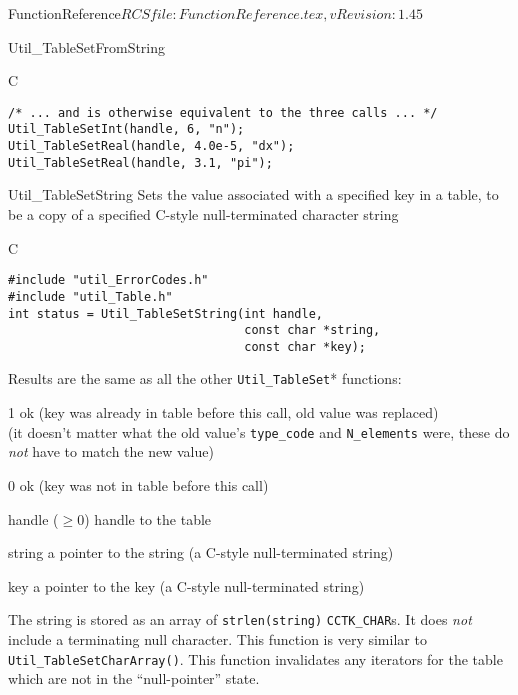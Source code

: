 \begin{cactuspart}{5}{FunctionReference}{$RCSfile: FunctionReference.tex,v $}{$Revision: 1.45 $}
\begin{FunctionDescription}{Util\_TableSetFromString}
\begin{Example}{C}
\begin{verbatim}
/* ... and is otherwise equivalent to the three calls ... */
Util_TableSetInt(handle, 6, "n");
Util_TableSetReal(handle, 4.0e-5, "dx");
Util_TableSetReal(handle, 3.1, "pi");
\end{verbatim}
\end{Example}
\end{FunctionDescription}


\begin{FunctionDescription}{Util\_TableSetString}
\label{Util-TableSetString}
Sets the value associated with a specified key in a table, to be
a copy of a specified C-style null-terminated character string

\begin{Synopsis}{C}
\begin{verbatim}
#include "util_ErrorCodes.h"
#include "util_Table.h"
int status = Util_TableSetString(int handle,
                                 const char *string,
                                 const char *key);
\end{verbatim}
\end{Synopsis}

\begin{ResultNote}
Results are the same as all the other \verb|Util_TableSet|* functions:
\end{ResultNote}
\begin{Result}{\rm 1}
ok (key was already in table before this call, old value was replaced)\\
   (it doesn't matter what the old value's \verb|type_code| and
    \verb|N_elements| were, \ie{} these do {\em not\/} have to match
    the new value)
\end{Result}
\begin{Result}{\rm 0}
ok (key was not in table before this call)
\end{Result}

\begin{Parameter}{handle ($\ge 0$)}
handle to the table
\end{Parameter}
\begin{Parameter}{string}
a pointer to the string (a C-style null-terminated string)
\end{Parameter}
\begin{Parameter}{key}
a pointer to the key (a C-style null-terminated string)
\end{Parameter}

\begin{Discussion}
The string is stored as an array of \verb|strlen(string)|
\verb|CCTK_CHAR|s.  It does {\em not\/} include a terminating
null character.
\NewPar
This function is very similar to \verb|Util_TableSetCharArray()|.
\NewPar
This function invalidates any iterators for the table which are
not in the ``null-pointer'' state.
\end{Discussion}


\end{FunctionDescription}
\end{cactuspart}
